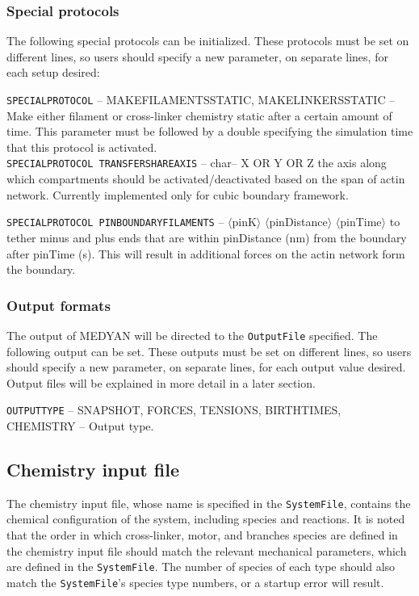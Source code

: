 \documentclass[11pt, oneside]{article}   	%
\begin{document}
\subsubsection{Special protocols}

The following special protocols can be initialized. These protocols must be set on different lines, so users should specify a new parameter, on separate lines, for each setup desired:\\

\small

\noindent\texttt{SPECIALPROTOCOL} -- MAKEFILAMENTSSTATIC, MAKELINKERSSTATIC -- Make either filament or cross-linker chemistry static after a certain amount of time. This parameter must be followed by a double specifying the simulation time that this protocol is activated.\\

\noindent  \texttt{SPECIALPROTOCOL TRANSFERSHAREAXIS} -- char-- X OR Y OR Z the axis along which compartments should be activated/deactivated based on the span of actin network. Currently implemented only for cubic boundary framework.

\noindent  \texttt{SPECIALPROTOCOL PINBOUNDARYFILAMENTS} -- $\langle$pinK$\rangle$ $\langle$pinDistance$\rangle$ $\langle$pinTime$\rangle$ to tether minus and plus ends that are within pinDistance (nm) from the boundary after pinTime (s). This will result in additional forces on the actin network form the boundary.

\subsubsection{Output formats}

The output of MEDYAN will be directed to the \texttt{OutputFile} specified. The following output can be set. These outputs must be set on different lines, so users should specify a new parameter, on separate lines, for each output value desired. Output files will be explained in more detail in a later section.\\

\small

  \noindent\texttt{OUTPUTTYPE} -- SNAPSHOT, FORCES, TENSIONS, BIRTHTIMES, CHEMISTRY -- Output type.\\
 
\normalsize


\subsection{Chemistry input file}
The chemistry input file, whose name is specified in the \texttt{SystemFile}, contains the chemical configuration of the system, including species and reactions. It is noted that the order in which cross-linker, motor, and branches species are defined in the chemistry input file should match the relevant mechanical parameters, which are defined in the \texttt{SystemFile}. The number of species of each type should also match the \texttt{SystemFile}'s species type numbers, or a startup error will result. \\
\end{document}
